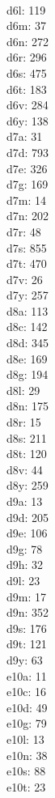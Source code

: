 \begin{multicols}{8}
  \\d6l: 119
  \\d6m: 37
  \\d6n: 272
  \\d6r: 296
  \\d6s: 475
  \\d6t: 183
  \\d6v: 284
  \\d6y: 138
  \\d7a: 31
  \\d7d: 793
  \\d7e: 326
  \\d7g: 169
  \\d7m: 14
  \\d7n: 202
  \\d7r: 48
  \\d7s: 855
  \\d7t: 470
  \\d7v: 26
  \\d7y: 257
  \\d8a: 113
  \\d8c: 142
  \\d8d: 345
  \\d8e: 169
  \\d8g: 194
  \\d8l: 29
  \\d8n: 175
  \\d8r: 15
  \\d8s: 211
  \\d8t: 120
  \\d8v: 44
  \\d8y: 259
  \\d9a: 13
  \\d9d: 205
  \\d9e: 106
  \\d9g: 78
  \\d9h: 32
  \\d9l: 23
  \\d9m: 17
  \\d9n: 352
  \\d9s: 176
  \\d9t: 121
  \\d9y: 63
  \\e10a: 11
  \\e10c: 16
  \\e10d: 49
  \\e10g: 79
  \\e10l: 13
  \\e10n: 38
  \\e10s: 88
  \\e10t: 23

\end{multicols}

